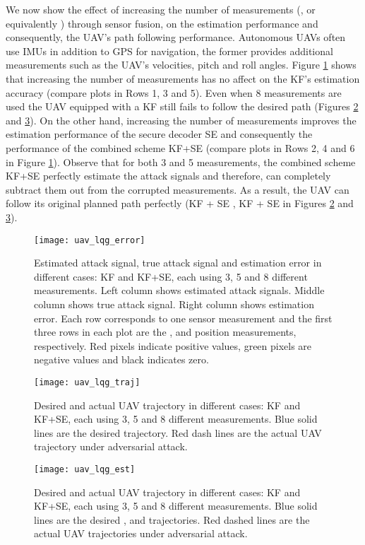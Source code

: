\documentclass[journal]{IEEEtran}
\begin{document}
We now show the effect of increasing the number of measurements (, or equivalently ) through sensor fusion, on the estimation performance and consequently, the UAV's path following performance. Autonomous UAVs often use IMUs in addition to GPS for navigation, the former provides additional measurements such as the UAV's velocities, pitch and roll angles. Figure \ref{fig:ex_uav_error} shows that increasing the number of measurements has no affect on the KF's estimation accuracy (compare plots in Rows 1, 3 and 5). 
Even when 8 measurements are used the UAV equipped with a KF still fails to follow the desired path (Figures \ref{fig:ex_uav_traj} and \ref{fig:ex_uav_est}). On the other hand, increasing the number of measurements improves the estimation performance of the secure decoder SE and consequently the performance of the combined scheme KF+SE (compare plots in Rows 2, 4 and 6 in Figure  \ref{fig:ex_uav_error}). Observe that for both 3 and 5 measurements, the combined scheme KF+SE perfectly estimate the attack signals and therefore, can completely subtract them out from the corrupted measurements. As a result, the UAV can follow its original planned path perfectly (KF + SE , KF + SE  in Figures \ref{fig:ex_uav_traj} and \ref{fig:ex_uav_est}).


\begin{figure}
\center
\texttt{[image: uav\_lqg\_error]}
\caption{Estimated attack signal, true attack signal and estimation error in different cases: KF and KF+SE, each using 3, 5 and 8 different measurements. Left column shows estimated attack signals. Middle column shows true attack signal. Right column shows estimation error. Each row corresponds to one sensor measurement and the first three rows in each plot are the ,  and  position measurements, respectively. Red pixels indicate positive values, green pixels are negative values and black indicates zero.}
\label{fig:ex_uav_error}
\end{figure}



\begin{figure}
\center
\texttt{[image: uav\_lqg\_traj]}
\caption{Desired and actual UAV trajectory in different cases: KF and KF+SE, each using 3, 5 and 8 different measurements. Blue solid lines are the desired trajectory. Red dash lines are the actual UAV trajectory under adversarial attack.}
\label{fig:ex_uav_traj}
\end{figure}


\begin{figure}
\center
\texttt{[image: uav\_lqg\_est]}
\caption{Desired and actual UAV trajectory in different cases: KF and KF+SE, each using 3, 5 and 8 different measurements. Blue solid lines are the desired ,  and  trajectories. Red dashed lines are the actual UAV trajectories under adversarial attack.}
\label{fig:ex_uav_est}
\end{figure}
\end{document}
